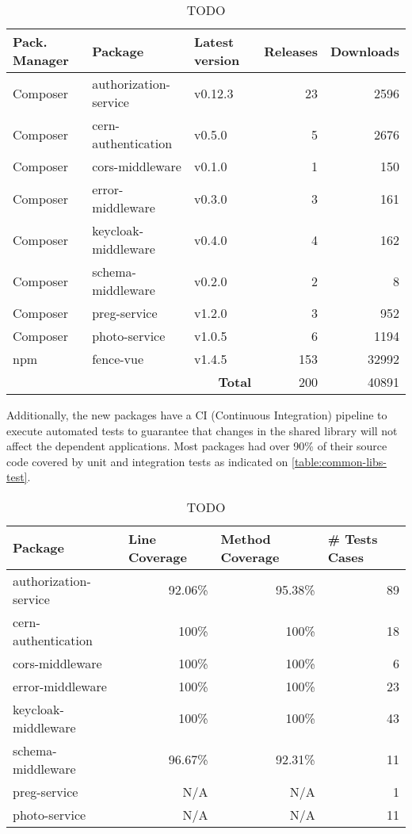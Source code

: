 \begin{table}[htbp]
\begin{tabular}{ll|l|r|r|}
\hline
\multicolumn{1}{|l|}{Pack. Manager} & Package & Latest version & \multicolumn{1}{l|}{Releases} & \multicolumn{1}{l|}{Downloads} \\ \hline
\multicolumn{1}{|l|}{Composer} & authorization-service & v0.12.3 & 23  & 2596  \\ 
\multicolumn{1}{|l|}{Composer} & cern-authentication   & v0.5.0  & 5   & 2676  \\ 
\multicolumn{1}{|l|}{Composer} & cors-middleware       & v0.1.0  & 1   & 150   \\ 
\multicolumn{1}{|l|}{Composer} & error-middleware      & v0.3.0  & 3   & 161   \\ 
\multicolumn{1}{|l|}{Composer} & keycloak-middleware   & v0.4.0  & 4   & 162   \\ 
\multicolumn{1}{|l|}{Composer} & schema-middleware     & v0.2.0  & 2   & 8     \\ 
\multicolumn{1}{|l|}{Composer} & preg-service          & v1.2.0  & 3   & 952   \\ 
\multicolumn{1}{|l|}{Composer} & photo-service         & v1.0.5  & 6   & 1194  \\ 
\multicolumn{1}{|l|}{npm}      & fence-vue             & v1.4.5  & 153 & 32992 \\
\hline
         & & \multicolumn{1}{r|}{\textbf{Total}} & 200 & 40891 \\
\cline{3-5} 
\end{tabular}
\caption{TODO}
\label{table:common-libs}
\end{table}

Additionally, the new packages have a CI (Continuous Integration) pipeline to execute automated tests to guarantee that changes in the shared library will not affect the dependent applications. Most packages had over 90\% of their source code covered by unit and integration tests as indicated on \autoref{table:common-libs-test}.

\begin{table}[htbp]
\begin{tabular}{|l|r|r|r|}
\hline
Package & \multicolumn{1}{l|}{Line Coverage} & \multicolumn{1}{l|}{Method Coverage} & \multicolumn{1}{l|}{\# Tests Cases} \\ \hline
authorization-service & 92.06\% & 95.38\% & 89 \\ 
cern-authentication   & 100\%   & 100\%   & 18 \\ 
cors-middleware       & 100\%   & 100\%   & 6  \\ 
error-middleware      & 100\%   & 100\%   & 23 \\ 
keycloak-middleware   & 100\%   & 100\%   & 43 \\ 
schema-middleware     & 96.67\% & 92.31\% & 11 \\
preg-service          & N/A     & N/A     & 1  \\
photo-service         & N/A     & N/A     & 11 \\
\hline
\end{tabular}
\caption{TODO}
\label{table:common-libs-test}
\end{table}

